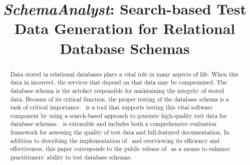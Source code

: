 \documentclass[conference]{IEEEtran}
\begin{document}
\title{\textit{SchemaAnalyst}: Search-based Test Data Generation for Relational Database Schemas}

\author{
\and
{}
}
\maketitle

\begin{abstract}

Data stored in relational databases plays a vital role in many aspects of life.  When this data in incorrect, the
services that depend on that data may be compromised.  The database schema is the artefact responsible for maintaining
the integrity of stored data. Because of its critical function, the proper testing of the database schema is a task of
critical importance. \sa~is a tool that supports testing this vital software component by using a search-based approach
to generate high-quality test data for database schemas. \sa~is extensible and includes both a comprehensive evaluation
framework for assessing the quality of test data and full-featured documentation. In addition to describing the
implementation of \sa~and overviewing its efficiency and effectiveness, this paper corresponds to the public release of
\sa~as a means to enhance practitioners' ability to test database schemas.

\end{abstract}

\vspace*{-.05in}










\end{document}
